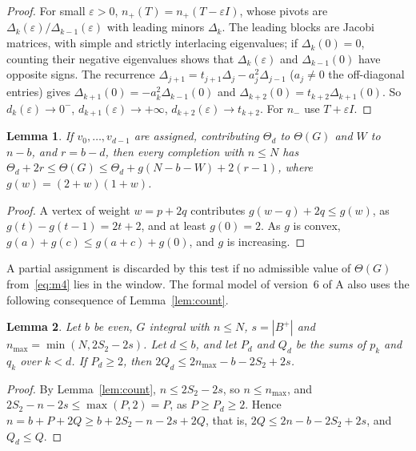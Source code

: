 \documentclass[11pt]{article}
\newtheorem{lemma}{Lemma}[section]
\theoremstyle{definition}
\theoremstyle{remark}
\begin{document}
\begin{proof}
For small $\varepsilon>0$, $n_+(T)=n_+(T-\varepsilon I)$, whose pivots are
$\Delta_k(\varepsilon)/\Delta_{k-1}(\varepsilon)$ with leading minors $\Delta_k$.
The leading blocks are Jacobi matrices, with simple and strictly interlacing
eigenvalues; if $\Delta_k(0)=0$, counting their negative eigenvalues shows
that $\Delta_k(\varepsilon)$ and $\Delta_{k-1}(0)$ have opposite signs. The
recurrence $\Delta_{j+1}=t_{j+1}\Delta_j-a_j^2\Delta_{j-1}$ ($a_j\ne0$ the
off-diagonal entries) gives $\Delta_{k+1}(0)=-a_k^2\Delta_{k-1}(0)$ and
$\Delta_{k+2}(0)=t_{k+2}\Delta_{k+1}(0)$. So $d_k(\varepsilon)\to0^-$,
$d_{k+1}(\varepsilon)\to+\infty$, $d_{k+2}(\varepsilon)\to t_{k+2}$. For $n_-$
use $T+\varepsilon I$.
\end{proof}

\begin{lemma}\label{lem:window}
If $v_0,\dots,v_{d-1}$ are assigned, contributing $\Theta_d$ to $\Theta(G)$ and
$W$ to $n-b$, and $r=b-d$, then every completion with $n\le N$ has
$\Theta_d+2r\le\Theta(G)\le\Theta_d+g(N-b-W)+2(r-1)$, where $g(w)=(2+w)(1+w)$.
\end{lemma}

\begin{proof}
A vertex of weight $w=p+2q$ contributes $g(w-q)+2q\le g(w)$, as
$g(t)-g(t-1)=2t+2$, and at least $g(0)=2$. As $g$ is convex,
$g(a)+g(c)\le g(a+c)+g(0)$, and $g$ is increasing.
\end{proof}

A partial assignment is discarded by this test if no admissible value of
$\Theta(G)$ from~\eqref{eq:m4} lies in the window. The formal model of version~6 of A also uses the following
consequence of Lemma~\ref{lem:count}.

\begin{lemma}\label{lem:partial}
Let $b$ be even, $G$ integral with $n\le N$, $s=|B^+|$ and
$n_{\max}=\min(N,2S_2-2s)$. Let $d\le b$, and let $P_d$ and $Q_d$ be the sums
of $p_k$ and $q_k$ over $k<d$. If $P_d\ge2$, then
$2Q_d\le2n_{\max}-b-2S_2+2s$.
\end{lemma}

\begin{proof}
By Lemma~\ref{lem:count}, $n\le2S_2-2s$, so $n\le n_{\max}$, and
$2S_2-n-2s\le\max(P,2)=P$, as $P\ge P_d\ge2$. Hence
$n=b+P+2Q\ge b+2S_2-n-2s+2Q$, that is, $2Q\le2n-b-2S_2+2s$, and $Q_d\le Q$.
\end{proof}
\end{document}

